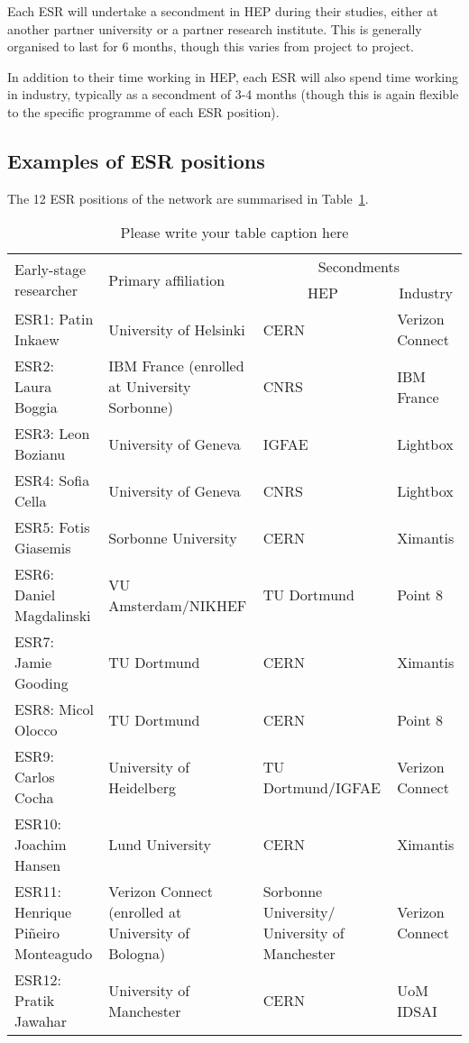 Each ESR will undertake a secondment in HEP during their studies, either at another partner university or a partner research institute. This is generally organised to last for 6 months, though this varies from project to project.\par

In addition to their time working in HEP, each ESR will also spend time working in industry, typically as a secondment of 3-4 months (though this is again flexible to the specific programme of each ESR position).

\subsection{Examples of ESR positions}
\label{esr-examples}
The 12 ESR positions of the network are summarised in Table~\ref{esr-positions}.\par
\begin{table}[h!]
    \footnotesize
    \centering
    \begin{tabular}{p{3.1cm}p{3.25cm}p{2.85cm}p{2cm}}
    \hline
    \multirow{2}{*}{\centering Early-stage researcher} & \multirow{2}{*}{\centering Primary affiliation} &  \multicolumn{2}{c}{Secondments} \\
    & & \multicolumn{1}{c}{HEP} & \multicolumn{1}{c}{Industry} \\\hline 
    ESR1: Patin Inkaew & University of Helsinki & CERN & Verizon Connect \\
    ESR2: Laura Boggia & IBM France (enrolled at University Sorbonne) & CNRS & IBM France \\
    ESR3: Leon Bozianu & University of Geneva & IGFAE
     & Lightbox \\
    ESR4: Sofia Cella & University of Geneva & CNRS & Lightbox \\
    ESR5: Fotis Giasemis & Sorbonne University & CERN & Ximantis \\
    ESR6: Daniel Magdalinski & VU Amsterdam/NIKHEF & TU Dortmund & Point 8 \\
    ESR7: Jamie Gooding & TU Dortmund & CERN & Ximantis \\
    ESR8: Micol Olocco & TU Dortmund & CERN & Point 8 \\
    ESR9: Carlos Cocha & University of Heidelberg & TU Dortmund/IGFAE & Verizon Connect \\
    ESR10: Joachim Hansen & Lund University & CERN & Ximantis \\
    ESR11: Henrique Pi\~neiro Monteagudo & Verizon Connect (enrolled at University of Bologna) & Sorbonne University/ University of Manchester & Verizon Connect \\
    ESR12: Pratik Jawahar & University of Manchester & CERN & UoM IDSAI \\\hline
    \end{tabular}
    \caption{Please write your table caption here}
    \label{esr-positions}       
\end{table}

